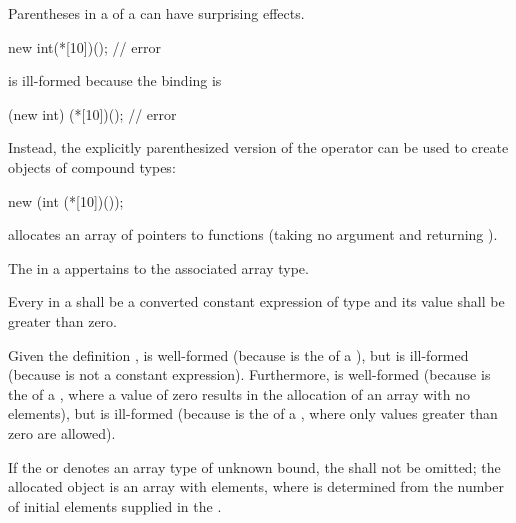 \pnum
\begin{note}
%
Parentheses in a  of a 
can have surprising effects.
\begin{example}
\begin{codeblock}
new int(*[10])();               // error
\end{codeblock}
is ill-formed because the binding is
\begin{codeblock}
(new int) (*[10])();            // error
\end{codeblock}

Instead, the explicitly parenthesized version of the 
operator can be used to create objects of compound
types:

\begin{codeblock}
new (int (*[10])());
\end{codeblock}
allocates an array of  pointers to functions (taking no
argument and returning ).
\end{example}
\end{note}

\pnum
The  in a  appertains
to the associated array type.

\pnum
Every  in a
 shall be a converted constant
expression of type  and
its value shall be greater than zero.
\begin{example}
Given the definition ,
 is well-formed (because  is the
 of a ), but
 is ill-formed (because  is not a
constant expression).
Furthermore,
 is well-formed
(because  is the 
of a ,
where a value of zero results in the allocation of an array with no elements),
but  is ill-formed
(because  is the 
of a ,
where only values greater than zero are allowed).
\end{example}

\pnum
If the  or 
denotes an array type of unknown bound,
the  shall not be omitted;
the allocated object is an array with  elements,
where  is determined from the number of initial elements
supplied in
the .

